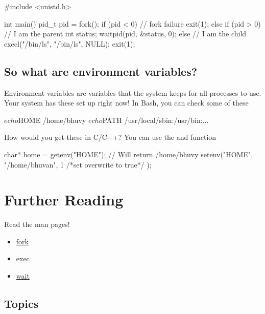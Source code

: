 \begin{code}[language=C][language=C]
#include <unistd.h>

int main() {
  pid_t pid = fork();
  if (pid < 0) { // fork failure
    exit(1);
  } else if (pid > 0) { // I am the parent
    int status;
    waitpid(pid, &status, 0);
  } else { // I am the child
    execl("/bin/ls", "/bin/ls", NULL);
    exit(1);
  }
}
\end{code}

\subsection{So what are environment variables?}\label{so-what-are-environment-variables}

Environment variables are variables that the system keeps for all processes to use. Your system has these set up right now! In Bash, you can check some of these

\begin{code}[language=C]
$ echo $HOME
/home/bhuvy
$ echo $PATH
/usr/local/sbin:/usr/bin:...
\end{code}

How would you get these in C/C++? You can use the  and  function

\begin{code}[language=C]
char* home = getenv("HOME"); // Will return /home/bhuvy
setenv("HOME", "/home/bhuvan", 1 /*set overwrite to true*/ );
\end{code}

\section{Further Reading}\label{how-can-i-find-out-more}

Read the man pages! 
\begin{itemize}
\item \href{http://man7.org/linux/man-pages/man2/fork.2.html}{fork} 
\item \href{http://man7.org/linux/man-pages/man3/exec.3.html}{exec} 
\item \href{http://man7.org/linux/man-pages/man2/wait.2.html}{wait}
\end{itemize}

\subsection{Topics}\label{topics}

